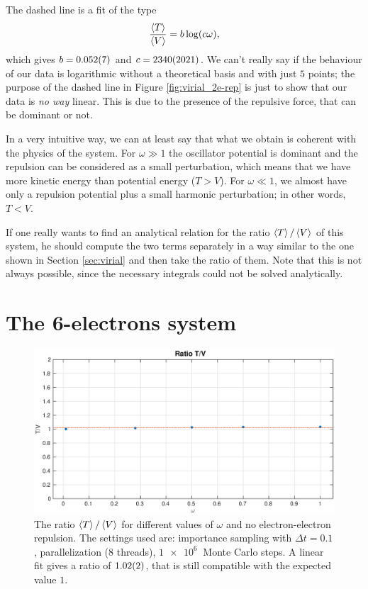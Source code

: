 \documentclass[a4paper,twoside,11pt]{book}
\begin{document}
The dashed line is a fit of the type
\begin{equation}
	\frac{\Braket{T}}{\Braket{V}} = b\log(c\omega),
\end{equation}
which gives $b = \SI{0.052 \pm 0.007}{}$ and $c = \SI{2340 \pm 2021}{}$. We can't really say if the behaviour of our data is logarithmic without a theoretical basis and with just $5$ points; the purpose of the dashed line in Figure \ref{fig:virial_2e-rep} is just to show that our data is \emph{no way} linear. This is due to the presence of the repulsive force, that can be dominant or not.

In a very intuitive way, we can at least say that what we obtain is coherent with the physics of the system. For $\omega \gg 1$ the oscillator potential is dominant and the repulsion can be considered as a small perturbation, which means that we have more kinetic energy than potential energy ($T > V$). For $\omega \ll 1$, we almost have only a repulsion potential plus a small harmonic perturbation; in other words, $T < V$.

If one really wants to find an analytical relation for the ratio $\Braket{T} / \Braket{V}$ of this system, he should compute the two terms separately in a way similar to the one shown in Section \ref{sec:virial} and then take the ratio of them. Note that this is not always possible, since the necessary integrals could not be solved analytically.


\section{The 6-electrons system}

\begin{figure}[H]
	\centering
	\includegraphics[width=\textwidth]{virial_6e-norep}
	\caption{The ratio $\Braket{T} / \Braket{V}$ for different values of $\omega$ and no electron-electron repulsion. The settings used are: importance sampling with $\Delta t = 0.1$, parallelization (8 threads), $\SI{1e6}{}$ Monte Carlo steps.
	A linear fit gives a ratio of $\SI{1.02 \pm 0.02}{}$, that is still compatible with the expected value $1$.}
	\label{fig:virial_6e-norep}
\end{figure}
\end{document}
